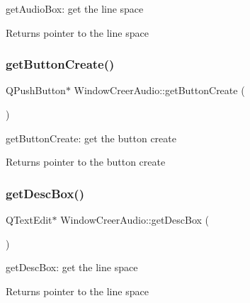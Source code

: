 get\+Audio\+Box\+: get the line space 

\begin{DoxyReturn}{Returns}
pointer to the line space 
\end{DoxyReturn}
\mbox{\label{class_window_creer_audio_add4e3e8a08180957f799e465b34efc7d}} 
\subsubsection{\texorpdfstring{get\+Button\+Create()}{getButtonCreate()}}
{\footnotesize\ttfamily Q\+Push\+Button$\ast$ Window\+Creer\+Audio\+::get\+Button\+Create (\begin{DoxyParamCaption}{ }\end{DoxyParamCaption})\hspace{0.3cm}{\ttfamily [inline]}}



get\+Button\+Create\+: get the button create 

\begin{DoxyReturn}{Returns}
pointer to the button create 
\end{DoxyReturn}
\mbox{\label{class_window_creer_audio_af644ad3d65f69e77c4d228773b010155}} 
\subsubsection{\texorpdfstring{get\+Desc\+Box()}{getDescBox()}}
{\footnotesize\ttfamily Q\+Text\+Edit$\ast$ Window\+Creer\+Audio\+::get\+Desc\+Box (\begin{DoxyParamCaption}{ }\end{DoxyParamCaption})\hspace{0.3cm}{\ttfamily [inline]}}



get\+Desc\+Box\+: get the line space 

\begin{DoxyReturn}{Returns}
pointer to the line space 
\end{DoxyReturn}
\mbox{\label{class_window_creer_audio_a8a6ff8cfc8cfee7a68ba522af12fcb4e}} 
